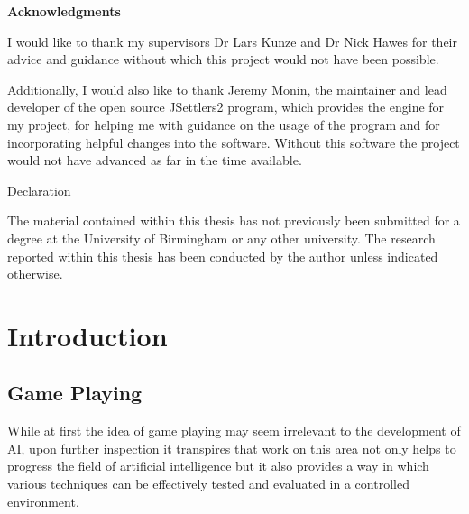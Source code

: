 \documentclass[]{article}
\let\oldsection\section
\renewcommand\section{\clearpage\oldsection}
\newenvironment{changemargin}[2]{%
\begin{list}{}{%
\setlength{\topsep}{0pt}%
\setlength{\leftmargin}{#1}%
\setlength{\rightmargin}{#2}%
\setlength{\listparindent}{\parindent}%
\setlength{\itemindent}{\parindent}%
\setlength{\parsep}{\parskip}%
}%
\item[]}{\end{list}}
\begin{document}
\thispagestyle{plain}
\begin{center}
    \huge
    \textbf{Acknowledgments}
    \\
    \large
    \vspace{0.5cm}
    \noindent\makebox[\linewidth]{\rule{\textwidth}{1pt}} 
\end{center}

\begin{changemargin}{1.8cm}{1.8cm}

I would like to thank my supervisors Dr Lars Kunze and Dr Nick Hawes for their advice and guidance without which this project would not have been possible.

\vspace{0.2cm}

Additionally, I would also like to thank Jeremy Monin, the maintainer and lead developer of the open source JSettlers2 program, which provides the engine for my project, for helping me with guidance on the usage of the program and for incorporating helpful changes into the software. Without this software the project would not have advanced as far in the time available.


\end{changemargin}
\pagebreak

\begin{center}
\Large \centering Declaration
\end{center}

\par The material contained within this thesis has not previously been submitted for a degree
at the University of Birmingham or any other university. The research reported within this
thesis has been conducted by the author unless indicated otherwise.

\tableofcontents

\pagebreak


\section{Introduction}
\subsection{Game Playing}
 While at first the idea of game playing may seem irrelevant to the development of AI, upon further inspection it transpires that work on this area not only helps to progress the field of artificial intelligence but it also provides a way in which various techniques can be effectively tested and evaluated in a controlled environment.
\end{document}
